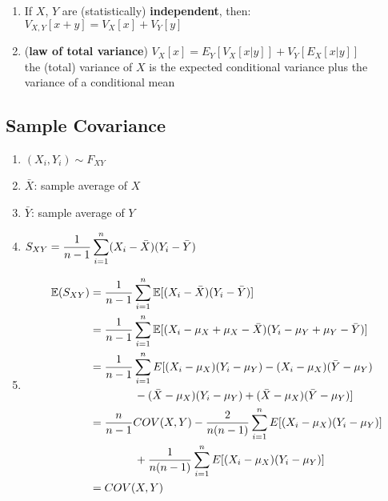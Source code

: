 \begin{enumerate}
\begin{enumerate}
    \end{enumerate}

    \item If $X$, $Y$ are (statistically) \textbf{independent}, then: $V_{X,Y}[x + y] = V_X[x] + V_Y[y]$

    \item (\textbf{law of total variance}) $V_X[x] = E_Y[V_X[x|y]]+ V_Y[E_X[x|y]]$ \\
    the (total) variance of $X$ is the expected conditional variance plus the variance of a conditional mean
\end{enumerate}

\subsection{Sample Covariance \cite{ism-1}}\label{Multivariate Distributions: Sample Covariance}

\begin{enumerate}
    \item[] $(X_i, Y_i) \sim F_{XY}$

    \item[] $\bar{X}$: sample average of $X$

    \item[] $\bar{Y}$: sample average of $Y$

    \item $
        S_{XY} = \dfrac{1}{n-1}
        \displaystyle\sum_{i=1}^{n}
        (X_i - \bar{X})(Y_i - \bar{Y})
    $

    \item \begin{align*}
        \mathbb{E}(S_{XY})
        &= \dfrac{1}{n-1}
        \displaystyle\sum_{i=1}^{n}
        \mathbb{E}[(X_i - \bar{X})(Y_i - \bar{Y})] \\
        &= \dfrac{1}{n-1}
        \displaystyle\sum_{i=1}^{n}
        \mathbb{E}[(X_i -\mu_X + \mu_X - \bar{X})
        (Y_i -\mu_Y + \mu_Y - \bar{Y})] \\
        &= \dfrac{1}{n-1}
        \displaystyle\sum_{i=1}^{n}
        E[(X_i - \mu_X )(Y_i - \mu_Y ) - (X_i - \mu_X )(\bar{Y} - \mu_Y ) \\
        & \quad\quad\quad\quad - (\bar{X} - \mu_X )(Y_i - \mu_Y ) + (\bar{X} - \mu_X )(\bar{Y} - \mu_Y )] \\
        &= \dfrac{n}{n-1}COV(X,Y) - \dfrac{2}{n(n-1)}
        \displaystyle\sum_{i=1}^n E[(X_i - \mu_X )(Y_i - \mu_Y )] \\
        &\quad\quad\quad\quad + \dfrac{1}{n(n-1)} \displaystyle\sum_{i=1}^n
        E[(X_i - \mu_X )(Y_i - \mu_Y )]\\
        &=COV(X, Y )
    \end{align*}
\end{enumerate}


